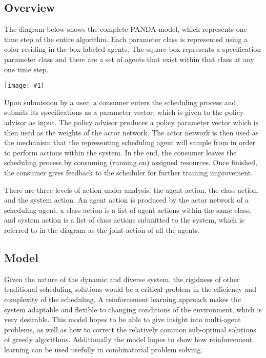 \documentclass{article}
\theoremstyle{definition}
\theoremstyle{remark}
\newcommand{\addpic}[1]{\texttt{[image: \#1]}}
\begin{document}
		\subsection{Overview}

		The diagram below shows the complete PANDA model, which represents one time step of the entire algorithm. Each parameter class is represented using a color residing in the box labeled agents. The square box represents a specification parameter class and there are a set of agents that exist within that class at any one time step.

		\addpic{figures/general_diagram.png}

		Upon submission by a user, a consumer enters the scheduling process and submits its specifications as a parameter vector, which is given to the policy advisor as input. The policy advisor produces a policy parameter vector which is then used as the weights of the actor network. The actor network is then used as the mechanism that the representing scheduling agent will sample from in order to perform actions within the system. In the end, the consumer leaves the scheduling process by consuming (running on) assigned resources. Once finished, the consumer gives feedback to the scheduler for further training improvement.

		There are three levels of action under analysis, the agent action, the class action, and the system action. An agent action is produced by the actor network of a scheduling agent, a class action is a list of agent actions within the same class, and system action is a list of class actions submitted to the system, which is referred to in the diagram as the joint action of all the agents.

		\subsection{Model}

		Given the nature of the dynamic and diverse system, the rigidness of other traditional scheduling solutions would be a critical problem in the efficiency and complexity of the scheduling. A reinforcement learning approach makes the system adaptable and flexible to changing conditions of the environment, which is very desirable. This model hopes to be able to give insight into multi-agent problems, as well as how to correct the relatively common sub-optimal solutions of greedy algorithms. Additionally the model hopes to show how reinforcement learning can be used usefully in combinatorial problem solving.
\end{document}
